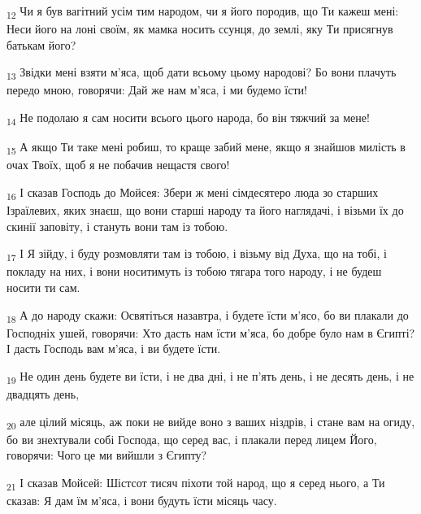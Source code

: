 \begin{tcolorbox}
\textsubscript{12} Чи я був вагітний усім тим народом, чи я його породив, що Ти кажеш мені: Неси його на лоні своїм, як мамка носить ссунця, до землі, яку Ти присягнув батькам його?
\end{tcolorbox}
\begin{tcolorbox}
\textsubscript{13} Звідки мені взяти м'яса, щоб дати всьому цьому народові? Бо вони плачуть передо мною, говорячи: Дай же нам м'яса, і ми будемо їсти!
\end{tcolorbox}
\begin{tcolorbox}
\textsubscript{14} Не подолаю я сам носити всього цього народа, бо він тяжчий за мене!
\end{tcolorbox}
\begin{tcolorbox}
\textsubscript{15} А якщо Ти таке мені робиш, то краще забий мене, якщо я знайшов милість в очах Твоїх, щоб я не побачив нещастя свого!
\end{tcolorbox}
\begin{tcolorbox}
\textsubscript{16} І сказав Господь до Мойсея: Збери ж мені сімдесятеро люда зо старших Ізраїлевих, яких знаєш, що вони старші народу та його наглядачі, і візьми їх до скинії заповіту, і стануть вони там із тобою.
\end{tcolorbox}
\begin{tcolorbox}
\textsubscript{17} І Я зійду, і буду розмовляти там із тобою, і візьму від Духа, що на тобі, і покладу на них, і вони носитимуть із тобою тягара того народу, і не будеш носити ти сам.
\end{tcolorbox}
\begin{tcolorbox}
\textsubscript{18} А до народу скажи: Освятіться назавтра, і будете їсти м'ясо, бо ви плакали до Господніх ушей, говорячи: Хто дасть нам їсти м'яса, бо добре було нам в Єгипті? І дасть Господь вам м'яса, і ви будете їсти.
\end{tcolorbox}
\begin{tcolorbox}
\textsubscript{19} Не один день будете ви їсти, і не два дні, і не п'ять день, і не десять день, і не двадцять день,
\end{tcolorbox}
\begin{tcolorbox}
\textsubscript{20} але цілий місяць, аж поки не вийде воно з ваших ніздрів, і стане вам на огиду, бо ви знехтували собі Господа, що серед вас, і плакали перед лицем Його, говорячи: Чого це ми вийшли з Єгипту?
\end{tcolorbox}
\begin{tcolorbox}
\textsubscript{21} І сказав Мойсей: Шістсот тисяч піхоти той народ, що я серед нього, а Ти сказав: Я дам їм м'яса, і вони будуть їсти місяць часу.
\end{tcolorbox}
